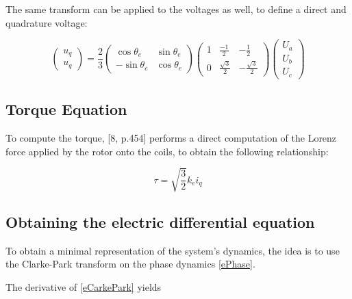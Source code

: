 \documentclass[a4paper,10pt]{article}
\begin{document}
The same transform can be applied to the voltages as well, to define a direct and quadrature voltage:

\begin{equation}
	\begin{pmatrix}
		u_q \\
		u_q
	\end{pmatrix} = \frac{2}{3} \begin{pmatrix}
		\cos \theta_e & \sin \theta_e \\
		-\sin \theta_e & \cos \theta_e
	\end{pmatrix} \begin{pmatrix}
		1 & \frac{-1}{2} & - \frac{1}{2} \\
		0 & \frac{\sqrt{3}}{2}& - \frac{\sqrt{3}}{2}
	\end{pmatrix}
	\begin{pmatrix}
		U_a \\
		U_b \\
		U_c
	\end{pmatrix}
	\label{eCarkeParkV}
\end{equation}

\subsection{Torque Equation}

To compute the torque, [8, p.454] performs a direct computation of the Lorenz force applied by the rotor onto the coils, to obtain the following relationship:

\begin{equation}
	\tau = \sqrt{\frac{3}{2}} k_e i_q
\end{equation}


\subsection{Obtaining the electric differential equation}

To obtain a minimal representation of the system's dynamics, the idea is to use the Clarke-Park transform on the phase dynamics \eqref{ePhase}.

The derivative of \eqref{eCarkePark} yields
\end{document}
